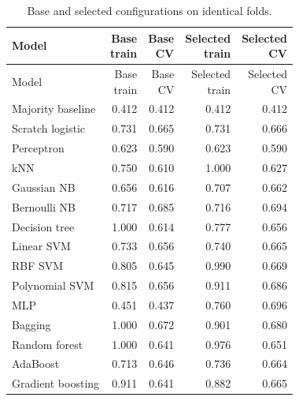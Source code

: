 \begin{longtable}{@{}p{3.6cm}rrrr@{}}
\caption{Base and selected configurations on identical folds.}\label{tab:overfit}\\
\toprule
Model & \shortstack{Base\\train} & \shortstack{Base\\CV} & \shortstack{Selected\\train} & \shortstack{Selected\\CV} \\
\midrule\endfirsthead
\toprule
Model & \shortstack{Base\\train} & \shortstack{Base\\CV} & \shortstack{Selected\\train} & \shortstack{Selected\\CV} \\
\midrule\endhead
\bottomrule\endfoot
Majority baseline & 0.412 & 0.412 & 0.412 & 0.412 \\
Scratch logistic & 0.731 & 0.665 & 0.731 & 0.666 \\
Perceptron & 0.623 & 0.590 & 0.623 & 0.590 \\
kNN & 0.750 & 0.610 & 1.000 & 0.627 \\
Gaussian NB & 0.656 & 0.616 & 0.707 & 0.662 \\
Bernoulli NB & 0.717 & 0.685 & 0.716 & 0.694 \\
Decision tree & 1.000 & 0.614 & 0.777 & 0.656 \\
Linear SVM & 0.733 & 0.656 & 0.740 & 0.665 \\
RBF SVM & 0.805 & 0.645 & 0.990 & 0.669 \\
Polynomial SVM & 0.815 & 0.656 & 0.911 & 0.686 \\
MLP & 0.451 & 0.437 & 0.760 & 0.696 \\
Bagging & 1.000 & 0.672 & 0.901 & 0.680 \\
Random forest & 1.000 & 0.641 & 0.976 & 0.651 \\
AdaBoost & 0.713 & 0.646 & 0.736 & 0.664 \\
Gradient boosting & 0.911 & 0.641 & 0.882 & 0.665 \\
\end{longtable}